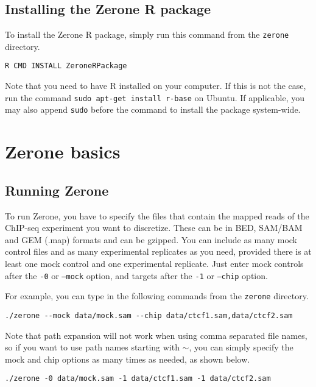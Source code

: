 \documentclass[12pt]{article}
\begin{document}
\subsection*{Installing the Zerone R package}

To install the Zerone R package, simply run this command from the
\texttt{zerone} directory.

\begin{verbatim}
R CMD INSTALL ZeroneRPackage
\end{verbatim}

Note that you need to have R installed on your computer. If this is not the
case, run the command \texttt{sudo apt-get install r-base} on Ubuntu.
If applicable, you may also append \texttt{sudo} before the command
to install the package system-wide.

\section{Zerone basics}

\subsection{Running Zerone}

To run Zerone, you have to specify the files that contain the mapped reads
of the ChIP-seq experiment you want to discretize. These can be in BED, SAM/BAM
and GEM (.map) formats and can be gzipped. You can include as many mock
control files and as many experimental replicates as you need, provided there
is at least one mock control and one experimental replicate. Just enter
mock controls after the \texttt{-0} or \texttt{--mock} option, and
targets after the \texttt{-1} or \texttt{--chip} option.

For example, you can type in the following commands from the \texttt{zerone}
directory.

\begin{verbatim}
./zerone --mock data/mock.sam --chip data/ctcf1.sam,data/ctcf2.sam
\end{verbatim}

Note that path expansion will not work when using comma separated file
names, so if you want to use path names starting with $\sim$, you can
simply specify the mock and chip options as many times as needed, as
shown below.

\begin{verbatim}
./zerone -0 data/mock.sam -1 data/ctcf1.sam -1 data/ctcf2.sam
\end{verbatim}
\end{document}
